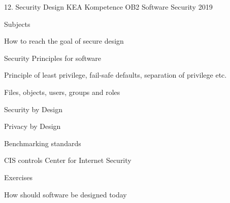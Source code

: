 \documentclass[Screen16to9,17pt]{foils}
\begin{document}
\mytitlepage
{12. Security Design}
{KEA Kompetence OB2 Software Security 2019}


\begin{list1}
\item Subjects
\begin{list2}
\item How to reach the goal of secure design
\item Security Principles for software
\item Principle of least privilege, fail-safe defaults, separation of privilege etc.
\item Files, objects, users, groups and roles
\item Security by Design
\item Privacy by Design
\item Benchmarking standards
\item CIS controls Center for Internet Security
\end{list2}
\item Exercises
\begin{list2}
\item How should software be designed today
\end{list2}
\end{list1}


\begin{list1}
\item
\item
\end{list1}



\begin{list1}
\item
\end{list1}





\end{document}
